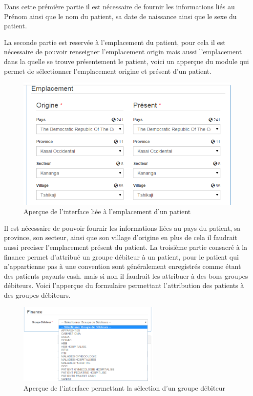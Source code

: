 \documentclass[12pt,a4paper]{report}
\begin{document}
Dans cette prémière partie il est nécessaire de fournir les informations liés au Prénom ainsi que le nom du patient, sa date de naissance ainsi que le sexe du patient.

La seconde partie est reservée à l'emplacement du patient, pour cela il est nécessaire de pouvoir renseigner l'emplacement origin mais aussi l'emplacement dans la quelle se trouve présentement le patient, voici un apperçue du module qui permet de sélectionner l'emplacement origine et présent d'un patient.

\begin{figure}[h]
\begin{center}
\includegraphics[width=12cm]{pic/EmplacementPatient.png}
\end{center}
\caption{Aperçue de l'interface liée à l'emplacement d'un patient}
\label{Aperçue de l'interface liée à l'emplacement d'un patient}
\end{figure}

Il est nécessaire de pouvoir fournir les informations liées au pays du patient, sa province, son secteur, ainsi que son village d'origine en plus de cela il faudrait aussi preciser l'emplacement présent du patient.
\newpage
La troisième partie consacré à la finance permet d'attribué un groupe débiteur à un patient, pour le patient qui n'appartienne pas à une convention sont généralement enregistrés comme étant des patients payants cash. mais si non il faudrait les attribuer à des bons groupes débiteurs. Voici l'apperçue du formulaire permettant l'attribution des patients à des groupes débiteurs.

\begin{figure}[h]
\begin{center}
\includegraphics[width=7cm]{pic/SelectGrDebiteur.png}
\end{center}
\caption{Aperçue de l'interface permettant la sélection d'un groupe débiteur}
\label{Aperçue de l'interface permettant la sélection d'un groupe débiteur}
\end{figure} 
 
\end{document}
